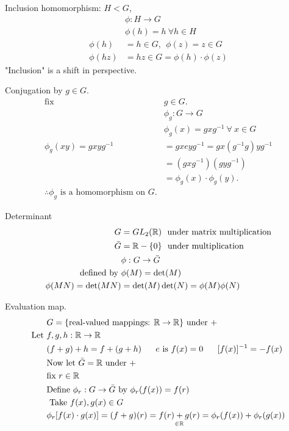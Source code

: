 \begin{example}
Inclusion homomorphism: $H<G$, 
\begin{align}
    &\phi : H\rightarrow G \nonumber \\
    &\phi(h)= h \nonumber \ \forall h \in H \\
    \phi(h)&=h\in G, \ \ \phi(z)=z\in G \nonumber \\
    \phi(hz)&=hz\in G = \phi(h)\cdot \phi(z) \nonumber
\end{align}
"Inclusion" is a shift in perspective.
\end{example}

\begin{example}
Conjugation by $g\in G$.
\begin{align}
    \text{fix } &g \in G. \nonumber \\
    &\phi_g: G\rightarrow G \nonumber \\
    &\phi_g(x)=gxg^{-1} \ \forall \ x \in G \nonumber \\
    \phi_g(xy)=gxyg^{-1}&=gxeyg^{-1}=gx(g^{-1}g)yg^{-1} \nonumber \\
    &=(gxg^{-1})(gyg^{-1}) \nonumber \\
    &=\phi_g(x)\cdot \phi_g(y). \nonumber \\
    \therefore \phi_g \text{ is a homomorphism on }G. \nonumber 
\end{align}
\end{example}

\begin{example}
Determinant
\begin{align}
    G&=GL_2({\mathbb{ R}}) \ \text{ under matrix multiplication} \nonumber \\
    \bar{G}&={\mathbb{ R}}-\{0\} \ \text{ under multiplication } \nonumber \\
    &\phi:G\rightarrow \bar{G} \nonumber\\
    \text{ defined by } &\phi(M)=\det(M) \nonumber\\
    \phi(MN)=\det(MN)&=\det(M)\det(N)=\phi(M)\phi(N) \nonumber 
\end{align}
\end{example}

\begin{example}
Evaluation map.
\begin{align}
    &G= \{\text{real-valued mappings: } \R \rightarrow \R \} \text{ under }+ \nonumber \\
    \text{Let }&f,g,h:\R \rightarrow \R \nonumber \\
    &(f+g)+h=f+(g+h) \ \ \ \ \ e\text{ is }f(x)=0 \ \ \ \ \ [f(x)]^{-1}=-f(x) \nonumber \\
    &\text{Now let } \bar{G} = \R \text{ under }+ \nonumber \\
    &\text{fix }r\in \R \nonumber \\
    &\text{Define } \phi_r:G\rightarrow \bar{G} \text{ by } \phi_r(f(x))=f(r) \nonumber \\
    &\text{ Take } f(x),g(x)\in G \nonumber \\
    &\phi_r[f(x)\cdot g(x)]=(f+g)(r)=\underset{\in \R}{f(r)+g(r)} = \phi_r(f(x))+\phi_r(g(x)) \nonumber
\end{align}
\end{example}

